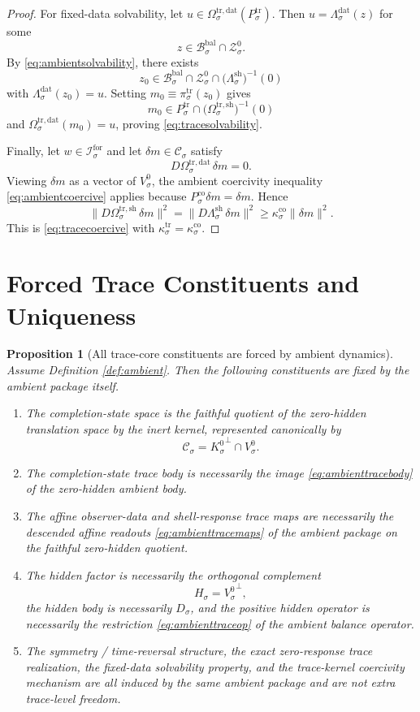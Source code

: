 \documentclass[11pt]{article}
\newcommand{\ForSpace}[1]{\mathcal I_{#1}^{\mathrm{for}}}
\newcommand{\BalBody}[1]{\mathcal B_{#1}^{\mathrm{bal}}}
\newcommand{\BalData}[1]{\Lambda_{#1}^{\mathrm{dat}}}
\newcommand{\BalShell}[1]{\Lambda_{#1}^{\mathrm{sh}}}
\newcommand{\ZeroHiddenSlice}[1]{\mathcal Z_{#1}^{0}}
\newcommand{\ZeroHiddenVec}[1]{V_{#1}^{0}}
\newcommand{\Kernel}[1]{K_{#1}^{0}}
\newcommand{\StateComp}[1]{P_{#1}^{\mathrm{co}}}
\newcommand{\GapSpace}[1]{H_{#1}}
\newcommand{\GapBody}[1]{D_{#1}}
\newcommand{\CoreState}[1]{\mathcal C_{#1}}
\newcommand{\TraceBody}[1]{P_{#1}^{\mathrm{tr}}}
\newcommand{\TraceCoord}[1]{\pi_{#1}^{\mathrm{tr}}}
\newcommand{\TraceDataMap}[1]{\Omega_{#1}^{\mathrm{tr,dat}}}
\newcommand{\TraceShellMap}[1]{\Omega_{#1}^{\mathrm{tr,sh}}}
\newtheorem{proposition}{Proposition}
\begin{document}
\begin{proof}
For fixed-data solvability, let \(u\in\TraceDataMap{\sigma}(\TraceBody{\sigma})\). Then \(u=\BalData{\sigma}(z)\) for some
\[
z\in\BalBody{\sigma}\cap\ZeroHiddenSlice{\sigma}.
\]
By \eqref{eq:ambientsolvability}, there exists
\[
z_{0}\in
\BalBody{\sigma}\cap
\ZeroHiddenSlice{\sigma}\cap
\bigl(\BalShell{\sigma}\bigr)^{-1}(0)
\]
with \(\BalData{\sigma}(z_{0})=u\). Setting \(m_{0}\equiv\TraceCoord{\sigma}(z_{0})\) gives
\[
m_{0}\in
\TraceBody{\sigma}\cap
\bigl(\TraceShellMap{\sigma}\bigr)^{-1}(0)
\]
and \(\TraceDataMap{\sigma}(m_{0})=u\), proving \eqref{eq:tracesolvability}.

Finally, let \(w\in\ForSpace{\sigma}\) and let \(\delta m\in\CoreState{\sigma}\) satisfy
\[
D\TraceDataMap{\sigma}\,\delta m=0.
\]
Viewing \(\delta m\) as a vector of \(\ZeroHiddenVec{\sigma}\), the ambient coercivity inequality \eqref{eq:ambientcoercive} applies because \(\StateComp{\sigma}\delta m=\delta m\). Hence
\[
\|D\TraceShellMap{\sigma}\,\delta m\|^{2}
=
\|D\BalShell{\sigma}\,\delta m\|^{2}
\ge
\kappa_{\sigma}^{\mathrm{co}}\|\delta m\|^{2}.
\]
This is \eqref{eq:tracecoercive} with \(\kappa_{\sigma}^{\mathrm{tr}}=\kappa_{\sigma}^{\mathrm{co}}\).
\end{proof}

\section{Forced Trace Constituents and Uniqueness}

\begin{proposition}[All trace-core constituents are forced by ambient dynamics]
\label{prop:forced}
Assume Definition \ref{def:ambient}. Then the following constituents are fixed by the ambient package itself.
\begin{enumerate}
    \item The completion-state space is the faithful quotient of the zero-hidden translation space by the inert kernel, represented canonically by
    \[
    \CoreState{\sigma}={\Kernel{\sigma}}^{\perp}\cap\ZeroHiddenVec{\sigma}.
    \]
    \item The completion-state trace body is necessarily the image \eqref{eq:ambienttracebody} of the zero-hidden ambient body.
    \item The affine observer-data and shell-response trace maps are necessarily the descended affine readouts \eqref{eq:ambienttracemaps} of the ambient package on the faithful zero-hidden quotient.
    \item The hidden factor is necessarily the orthogonal complement
    \[
    \GapSpace{\sigma}={\ZeroHiddenVec{\sigma}}^{\perp},
    \]
    the hidden body is necessarily \(\GapBody{\sigma}\), and the positive hidden operator is necessarily the restriction \eqref{eq:ambienttraceop} of the ambient balance operator.
    \item The symmetry / time-reversal structure, the exact zero-response trace realization, the fixed-data solvability property, and the trace-kernel coercivity mechanism are all induced by the same ambient package and are not extra trace-level freedom.
\end{enumerate}
\end{proposition}
\end{document}
